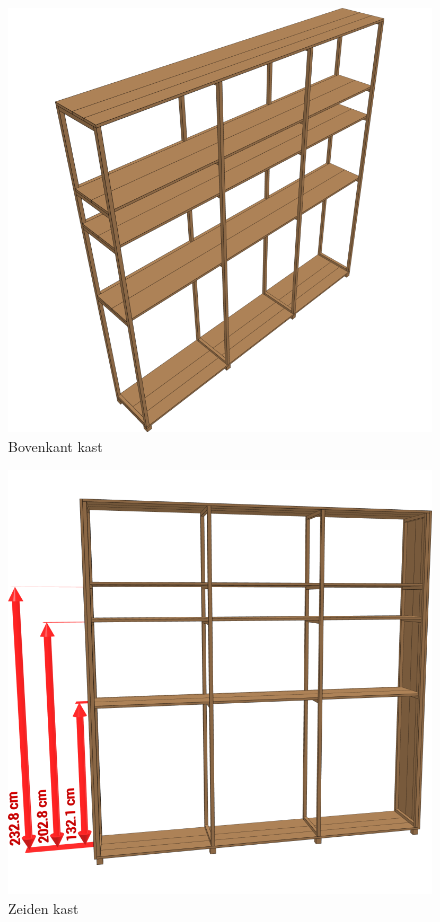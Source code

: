 \documentclass{article}
\begin{document}
\begin{figure}[h!]
    \centering
    \includegraphics[width=\textwidth]{scene 7 - boven.png}
    \caption{Bovenkant kast}
\end{figure}

\begin{figure}[h!]
    \centering
    \includegraphics[width=\textwidth]{scene 8 - links_rechts.png}
    \caption{Zeiden kast}
\end{figure}
\end{document}
